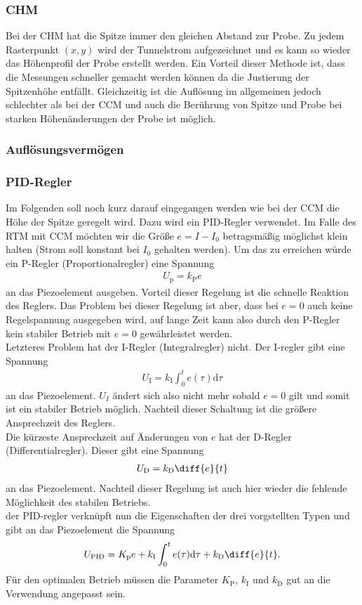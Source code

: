 \subsubsection{CHM}
Bei der CHM hat die Spitze immer den gleichen Abstand zur Probe. Zu jedem Rasterpunkt $(x,y)$ wird der Tunnelstrom aufgezeichnet und es kann so wieder das Höhenprofil der Probe erstellt werden. Ein Vorteil dieser Methode ist, dass die Messungen schneller gemacht werden können da die Justierung der Spitzenhöhe entfällt. Gleichzeitig ist die Auflösung im allgemeinen jedoch schlechter als bei der CCM und auch die Berührung von Spitze und Probe bei starken Höhenänderungen der Probe ist möglich.

\subsubsection{Auflösungsvermögen}


\subsubsection{PID-Regler}
Im Folgenden soll noch kurz darauf eingegangen werden wie bei der CCM die Höhe der Spitze geregelt wird. Dazu wird ein PID-Regler verwendet. Im Falle des RTM mit CCM möchten wir die Größe $e=I-I_0$ betragsmäßig möglichst klein halten (Strom soll konstant bei $I_0$ gehalten werden). Um das zu erreichen würde ein P-Regler (Proportionalregler) eine Spannung 
\begin{align*}
  U_\mathrm{p}=k_\mathrm{P}e
\end{align*} 
an das Piezoelement ausgeben. Vorteil dieser Regelung ist die schnelle Reaktion des Reglers. Das Problem bei dieser Regelung ist aber, dass bei $e=0$ auch keine Regelspannung ausgegeben wird, auf lange Zeit kann also durch den P-Regler kein stabiler Betrieb mit $e=0$ gewährleistet werden.\\
Letzteres Problem hat der I-Regler (Integralregler) nicht. Der I-regler gibt eine Spannung
\begin{align*}
  U_\mathrm{I}=k_\mathrm{I}\int_0^t e(\tau) \mathrm{d}\tau 
\end{align*}
an das Piezoelement. $U_I$ ändert sich also nicht mehr sobald $e=0$ gilt und somit ist ein stabiler Betrieb möglich. Nachteil dieser Schaltung ist die größere Ansprechzeit des Reglers. \\
Die kürzeste Ansprechzeit auf Änderungen von $e$ hat der D-Regler (Differentialregler). Dieser gibt eine Spannung 
\begin{align*}
  U_\mathrm{D}=k_\mathrm{D} \diff{e}{t}
\end{align*}
an das Piezoelement. Nachteil dieser Regelung ist auch hier wieder die fehlende Möglichkeit des stabilen Betriebs. \\
der PID-regler verknüpft nun die Eigenschaften der drei vorgstellten Typen und gibt an das Piezoelement die Spannung
\begin{align*}
  U_\mathrm{PID}=K_\mathrm{p}e + k_\mathrm{I}\int_0^t e(\tau) \mathrm{d}\tau + k_\mathrm{D} \diff{e}{t}.
\end{align*}
Für den optimalen Betrieb müssen die Parameter $K_\mathrm{P}$, $k_\mathrm{I}$ und $k_\mathrm{D}$ gut an die Verwendung angepasst sein.

